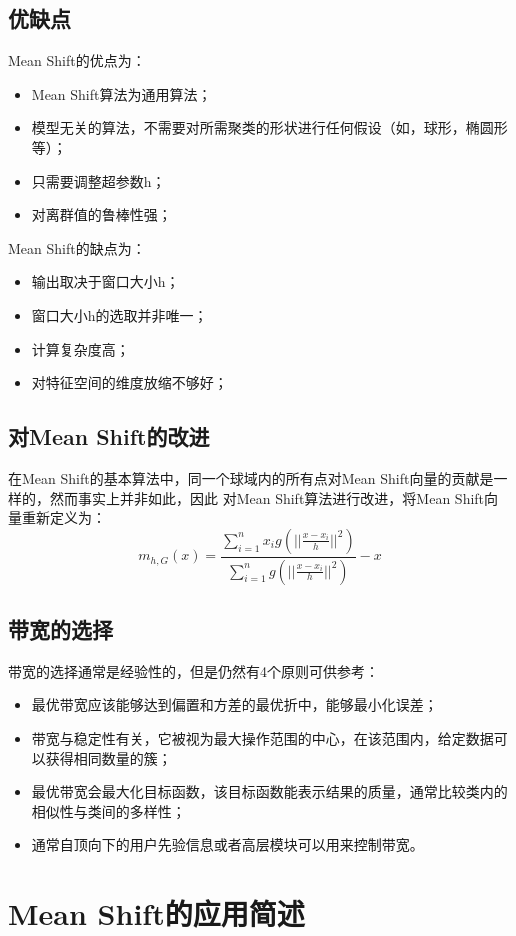 \documentclass{article}
\begin{document}
\subsection{优缺点}
Mean Shift的优点为：
\begin{itemize}
    \item Mean Shift算法为通用算法；
    \item 模型无关的算法，不需要对所需聚类的形状进行任何假设（如，球形，椭圆形等）；
    \item 只需要调整超参数h；
    \item 对离群值的鲁棒性强；
\end{itemize}
Mean Shift的缺点为：
\begin{itemize}
    \item 输出取决于窗口大小h；
    \item 窗口大小h的选取并非唯一；
    \item 计算复杂度高；
    \item 对特征空间的维度放缩不够好；
\end{itemize}

\subsection{对Mean Shift的改进}
在Mean Shift的基本算法中，同一个球域内的所有点对Mean Shift向量的贡献是一样的，然而事实上并非如此，因此
对Mean Shift算法进行改进，将Mean Shift向量重新定义为：
$$ 
m_{h, G}(x) = \frac{{\sum}_{i=1}^nx_ig(||\frac{x-x_i}{h}||^2)}{{\sum}_{i=1}^ng(||\frac{x-x_i}{h}||^2)} - x
$$

\subsection{带宽的选择}
带宽的选择通常是经验性的，但是仍然有4个原则可供参考：
\begin{itemize}
    \item 最优带宽应该能够达到偏置和方差的最优折中，能够最小化误差；
    \item 带宽与稳定性有关，它被视为最大操作范围的中心，在该范围内，给定数据可以获得相同数量的簇；
    \item 最优带宽会最大化目标函数，该目标函数能表示结果的质量，通常比较类内的相似性与类间的多样性；
    \item 通常自顶向下的用户先验信息或者高层模块可以用来控制带宽。
\end{itemize}

\section{Mean Shift的应用简述}
\end{document}
